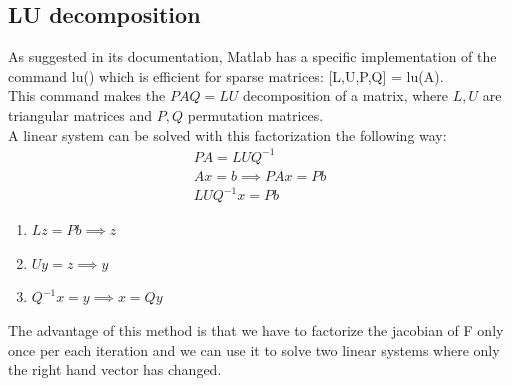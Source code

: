 \documentclass[]{article}
\begin{document}
\subsection{LU decomposition}
As suggested in its documentation, Matlab has a specific implementation of the command lu() which is efficient for sparse matrices: [L,U,P,Q] = lu(A).\\
This command makes the $PAQ = LU$ decomposition of a matrix, where $L,U$ are triangular matrices and $P,Q$ permutation matrices.\\
A linear system can be solved with this factorization the following way:
\begin{equation*}
\begin{split}
PA = LUQ^{-1}\\
Ax = b \implies PAx = Pb\\
LUQ^{-1}x = Pb
\end{split}
\end{equation*}
\begin{enumerate}
	\item $Lz = Pb \implies z$
	\item $Uy = z \implies y$
	\item $Q^{-1}x = y \implies x = Qy$
\end{enumerate}
The advantage of this method is that we have to factorize the jacobian of F only once per each iteration and we can use it to solve two linear systems where only the right hand vector has changed.
\end{document}
